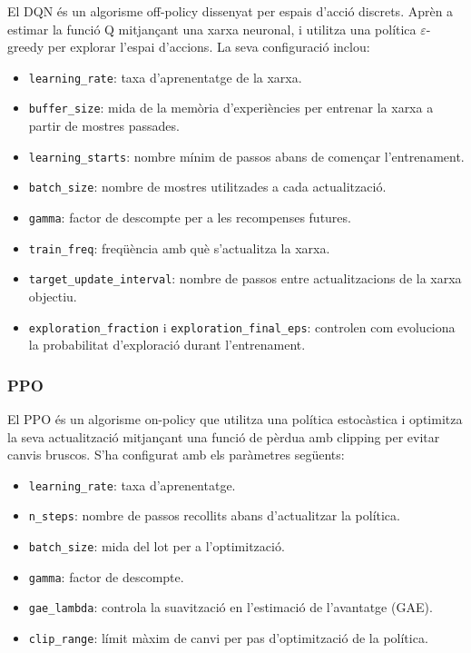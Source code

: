 \documentclass[12pt,a4paper,twoside]{book}
\begin{document}
El DQN és un algorisme off-policy dissenyat per espais d'acció discrets. Aprèn a estimar la funció Q mitjançant una xarxa neuronal, i utilitza una política $\varepsilon$-greedy per explorar l'espai d'accions. La seva configuració inclou:

\begin{itemize}
    \item \texttt{learning\_rate}: taxa d'aprenentatge de la xarxa.
    \item \texttt{buffer\_size}: mida de la memòria d'experiències per entrenar la xarxa a partir de mostres passades.
    \item \texttt{learning\_starts}: nombre mínim de passos abans de començar l'entrenament.
    \item \texttt{batch\_size}: nombre de mostres utilitzades a cada actualització.
    \item \texttt{gamma}: factor de descompte per a les recompenses futures.
    \item \texttt{train\_freq}: freqüència amb què s'actualitza la xarxa.
    \item \texttt{target\_update\_interval}: nombre de passos entre actualitzacions de la xarxa objectiu.
    \item \texttt{exploration\_fraction} i \texttt{exploration\_final\_eps}: controlen com evoluciona la probabilitat d'exploració durant l'entrenament.
\end{itemize}

\subsubsection{PPO}

El PPO és un algorisme on-policy que utilitza una política estocàstica i optimitza la seva actualització mitjançant una funció de pèrdua amb clipping per evitar canvis bruscos. S'ha configurat amb els paràmetres següents:

\begin{itemize}
    \item \texttt{learning\_rate}: taxa d'aprenentatge.
    \item \texttt{n\_steps}: nombre de passos recollits abans d'actualitzar la política.
    \item \texttt{batch\_size}: mida del lot per a l'optimització.
    \item \texttt{gamma}: factor de descompte.
    \item \texttt{gae\_lambda}: controla la suavització en l'estimació de l'avantatge (GAE).
    \item \texttt{clip\_range}: límit màxim de canvi per pas d'optimització de la política.
\end{itemize}
\end{document}
